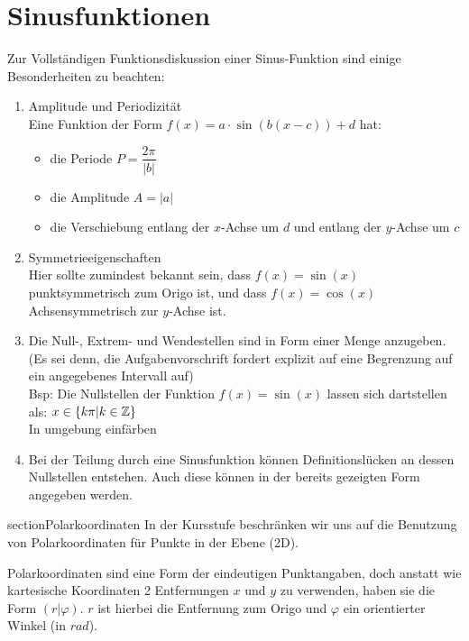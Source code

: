 \section{Sinusfunktionen}
Zur Vollständigen Funktionsdiskussion einer Sinus-Funktion sind einige Besonderheiten zu beachten:
\begin{enumerate}
\item Amplitude und Periodizität\\
Eine Funktion der Form $f(x)=a\cdot\sin(b(x-c))+d$ hat:\begin{itemize}
\item die Periode $P = \dfrac{2\pi}{|b|}$
\item die Amplitude $A = |a|$
\item die Verschiebung entlang der $x$-Achse um $d$ und entlang der $y$-Achse um $c$
\end{itemize}
\item Symmetrieeigenschaften\\
Hier sollte zumindest bekannt sein, dass $f(x)=\sin(x)$ punktsymmetrisch zum Origo ist, und dass $f(x)=\cos(x)$ Achsensymmetrisch zur $y$-Achse ist.
\item Die Null-, Extrem- und Wendestellen sind in Form einer Menge anzugeben. (Es sei denn, die Aufgabenvorschrift fordert explizit auf eine Begrenzung auf ein angegebenes Intervall auf)\\
Bsp: Die Nullstellen der Funktion $f(x)=\sin(x)$ lassen sich dartstellen als: $x \in \{k\pi|k \in \mathbb{Z}\}$
\\ In umgebung einfärben
\item Bei der Teilung durch eine Sinusfunktion können Definitionslücken an dessen Nullstellen entstehen. Auch diese können in der bereits gezeigten Form angegeben werden.
\end{enumerate}section{Polarkoordinaten}
In der Kursstufe beschränken wir uns auf die Benutzung von Polarkoordinaten für Punkte in der Ebene (2D).
\begin{Bws}
Polarkoordinaten sind eine Form der eindeutigen Punktangaben, doch anstatt wie kartesische Koordinaten 2 Entfernungen $x$ und $y$ zu verwenden, haben sie die Form $(r|\varphi)$. $r$ ist hierbei die Entfernung zum Origo und $\varphi$ ein orientierter Winkel (in $rad$).
\end{Bws}
